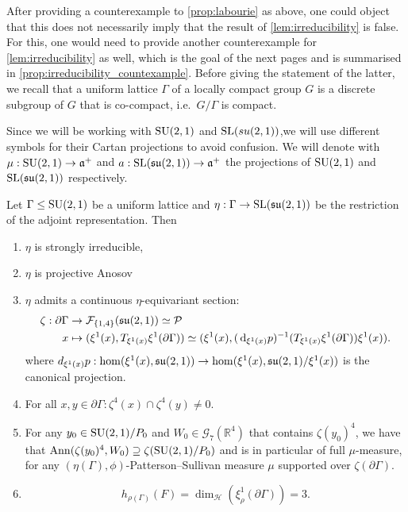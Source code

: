 \documentclass{report}
\begin{document}
After providing a counterexample to \cref{prop:labourie} as above, one could object that this does not necessarily imply that the result of \cref{lem:irreducibility} is false.
For this, one would need to provide another counterexample for \cref{lem:irreducibility} as well, which is the goal of the next pages and is summarised in \cref{prop:irreducibility_countexample}.
Before giving the statement of the latter, we recall that a uniform lattice $\Gamma$  of a locally compact group $G$ is a discrete subgroup of $G$ that is co-compact, i.e.\ $G/\Gamma$ is compact.

Since we will be working with $\operatorname{{\mathrm{SU}}}(2,1)$ and $\operatorname{{\mathrm{SL}}}(su(2,1))$,we will use different symbols for their Cartan projections to avoid confusion.
We will denote with $\mu: \operatorname{{\mathrm{SU}}}(2,1) \to \mathfrak a^+$ and $a:\operatorname{{\mathrm{SL}}}(\operatorname{{\mathfrak{su}}}(2,1)) \to \mathfrak a^+$ the projections of $ \operatorname{{\mathrm{SU}}}(2,1)$ and $\operatorname{{\mathrm{SL}}}(\operatorname{{\mathfrak{su}}}(2,1))$ respectively.

\begin{proposition}\label{prop:irreducibility_countexample}
    Let $\Gamma \leq \operatorname{{\mathrm{SU}}}(2,1)$ be a uniform lattice and $\eta: \Gamma \to \operatorname{{\mathrm{SL}}}(\mathfrak{su}(2,1))$ be the restriction of the adjoint representation.
    Then
    \begin{enumerate}[label=(\roman*)]
        \item $\eta$ is strongly irreducible,
        \item $\eta$ is projective Anosov
        \item $\eta$ admits a continuous $\eta$-equivariant section: 
        \begin{align*}
            \zeta: \partial \Gamma &\to \mathcal F_{\{1, 4 \}}(\mathfrak{su}(2,1)) \simeq \mathcal P\\
            x &\mapsto (\xi^1(x), T_{\xi^1(x)} \xi^1(\partial \Gamma)) \simeq (\xi^1(x), (\,\mathrm{d}_{\xi^1(x)}p)^{-1}(T_{\xi^1(x)}\xi^1(\partial \Gamma))\xi^1(x)).
        \end{align*}
        where $d_{\xi^1(x)}p: \hom( \xi^1(x), \operatorname{{\mathfrak{su}}}(2,1)) \to \hom(\xi^1(x), \operatorname{{\mathfrak{su}}}(2,1)/ \xi^1(x))$ is the canonical projection.
        \item For all $x, y \in \partial \Gamma: \zeta^4(x) \cap \zeta^4(y) \neq 0$.
        \item For any $y_0 \in \operatorname{{\mathrm{SU}}}(2,1)/P_0$ and 
        $W_0 \in \mathcal G_7(\mathbb R^4)$ that contains $\zeta(y_0)^4$, we have that 
        $\operatorname{Ann}(\zeta(y_0)^4, W_0) \supseteq \zeta(\operatorname{{\mathrm{SU}}}(2,1)/P_0)$ and is in particular of full $\mu$-measure, for any $(\eta(\Gamma), \phi)$-Patterson--Sullivan measure $\mu$ supported over
        $\zeta(\partial \Gamma)$.
        \item
        \[
        h_{\rho(\Gamma)}(F) = \dim_{\mathcal H} (\xi^1_\rho(\partial \Gamma)) = 3.
        \]
    \end{enumerate}
\end{proposition}
\end{document}

